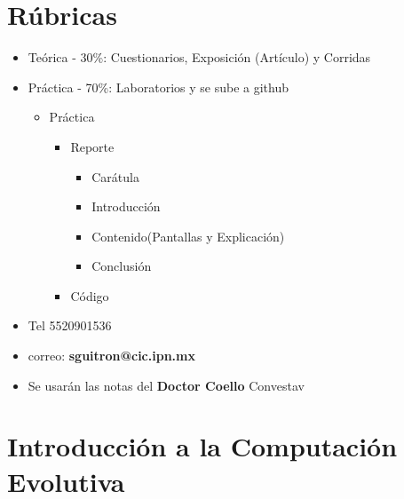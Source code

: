 \documentclass{article}
\begin{document}
\maketitle
\part{Rúbricas}
\begin{itemize}
	\item Teórica - 30\%: Cuestionarios, Exposición (Artículo) y Corridas
	\item Práctica - 70\%: Laboratorios y se sube a github
	\begin{itemize}
		\item[] Práctica
		\begin{itemize}
			\item[] Reporte
			\begin{itemize}
				\item Carátula
				\item Introducción
				\item Contenido(Pantallas y Explicación)
				\item Conclusión
			\end{itemize}
			\item[] Código
		\end{itemize}
	\end{itemize}
	\item Tel 5520901536
	\item correo: \textbf{sguitron@cic.ipn.mx}
	\item Se usarán las notas del \textbf{Doctor Coello} Convestav
\end{itemize}
\part{Introducción a la Computación Evolutiva}
\end{document}
